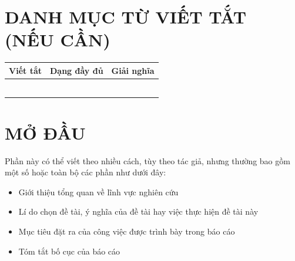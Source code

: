\documentclass[12pt,a4paper]{report}
\begin{document}
\tableofcontents
\newpage

\listoffigures
\newpage

\listoftables
\newpage

\chapter*{DANH MỤC TỪ VIẾT TẮT (NẾU CẦN)}
\begin{table}[h]
    \centering
    \renewcommand{\arraystretch}{1.3}
    \begin{tabular}{|p{3cm}|p{5cm}|p{5cm}|}
        \hline
        \textbf{Viết tắt} & \textbf{Dạng đầy đủ} & \textbf{Giải nghĩa} \\
        \hline
         &  &  \\ \hline
         &  &  \\ \hline
         &  &  \\ \hline
         &  &  \\ \hline
         &  &  \\ \hline
         &  &  \\ \hline
    \end{tabular}
\end{table}
\newpage


\chapter{MỞ ĐẦU}
Phần này có thể viết theo nhiều cách, tùy theo tác giả, nhưng thường bao gồm một số hoặc toàn bộ các phần như dưới đây:
\begin{itemize}
    \item Giới thiệu tổng quan về lĩnh vực nghiên cứu
    \item Lí do chọn đề tài, ý nghĩa của đề tài hay việc thực hiện đề tài này
    \item Mục tiêu đặt ra của công việc được trình bày trong báo cáo
    \item Tóm tắt bố cục của báo cáo
\end{itemize}
\end{document}
